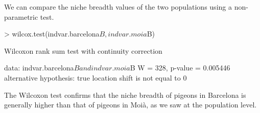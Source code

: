 \documentclass[11pt,a4paper]{article}
\begin{document}
We can compare the niche breadth values of the two populations using a non-parametric test.
\begin{Schunk}
\begin{Sinput}
> wilcox.test(indvar.barcelona$B, indvar.moia$B)
\end{Sinput}
\begin{Soutput}
	Wilcoxon rank sum test with continuity correction

data:  indvar.barcelona$B and indvar.moia$B
W = 328, p-value = 0.005446
alternative hypothesis: true location shift is not equal to 0
\end{Soutput}
\end{Schunk}
The Wilcoxon test confirms that the niche breadth of pigeons in Barcelona is generally higher than that of pigeons in Moià, as we saw at the population level.
\end{document}
